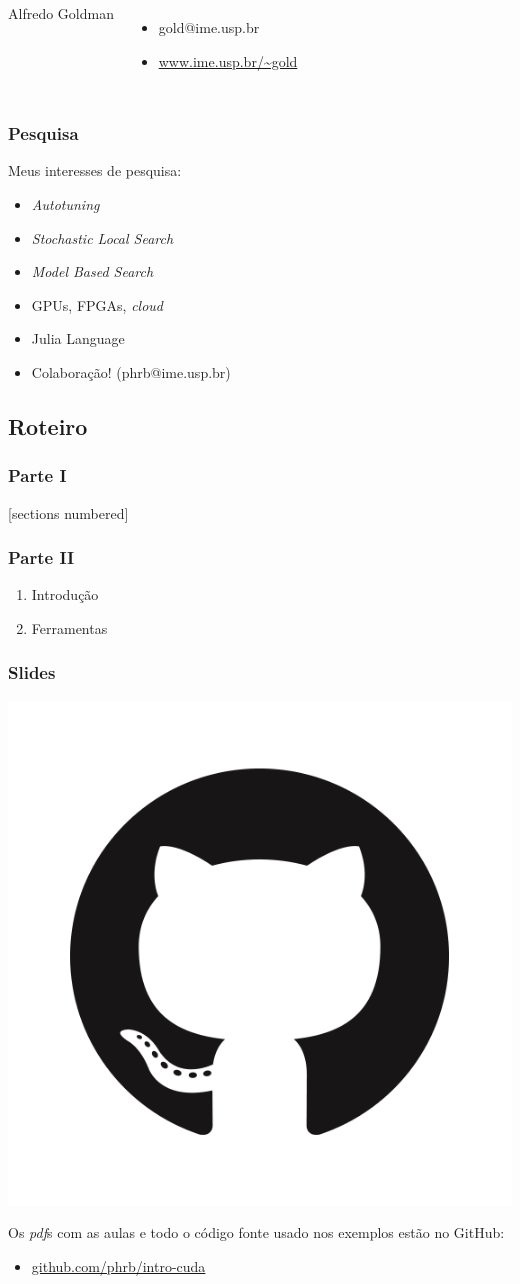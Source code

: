 \documentclass[10pt, compress]{beamer}
\begin{document}
\begin{frame}
\begin{columns}[T,onlytextwidth]
\begin{center}
            Alfredo Goldman
        \end{center}

        \begin{itemize}
            \item \alert{gold}@ime.usp.br
            \item \url{www.ime.usp.br/~gold}
        \end{itemize}
    \end{columns}
\end{frame}

\begin{frame}
    \frametitle{Pesquisa}
    Meus interesses de \alert{pesquisa}:
    \begin{itemize}
        \item \textit{Autotuning}
        \item \textit{Stochastic Local Search}
        \item \textit{Model Based Search}
            \pause
        \item GPUs, FPGAs, \textit{cloud}
        \item Julia Language
            \pause
        \item Colaboração! (\alert{phrb@ime.usp.br})
    \end{itemize}
\end{frame}

\subsection{Roteiro}

\begin{frame}
    \frametitle{Parte I}
    [sections numbered]
    \tableofcontents[hideallsubsections]
\end{frame}

\begin{frame}
    \frametitle{Parte II}
    \begin{enumerate}
        \item Introdução
        \item Ferramentas
    \end{enumerate}
\end{frame}

\begin{frame}
    \frametitle{Slides}
    \begin{center}
        \includegraphics[width=.18\textwidth]{github}
    \end{center}
    Os \emph{pdf}s com as aulas e todo o código fonte usado nos exemplos estão
    no \alert{GitHub}:

    \begin{itemize}
        \item \url{github.com/phrb/intro-cuda}
    \end{itemize}
\end{frame}
\end{document}
